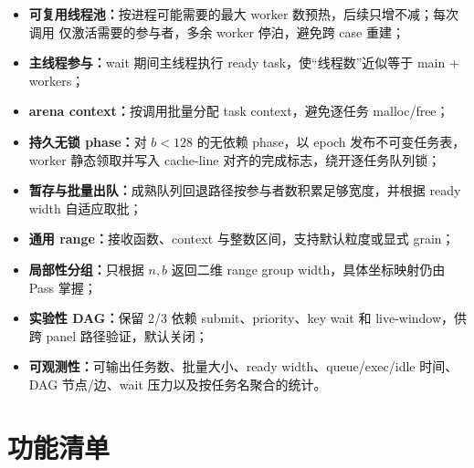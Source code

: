 \documentclass[UTF8,a4paper,openany,11pt,fontset=fandol]{ctexrep}
\begin{document}
\begin{itemize}
  \item \textbf{可复用线程池：}按进程可能需要的最大 worker 数预热，后续只增不减；每次调用
        仅激活需要的参与者，多余 worker 停泊，避免跨 case 重建；
  \item \textbf{主线程参与：}wait 期间主线程执行 ready task，使“线程数”近似等于
        main + workers；
  \item \textbf{arena context：}按调用批量分配 task context，避免逐任务 malloc/free；
  \item \textbf{持久无锁 phase：}对 \(b<128\) 的无依赖 phase，以 epoch 发布不可变任务表，
        worker 静态领取并写入 cache-line 对齐的完成标志，绕开逐任务队列锁；
  \item \textbf{暂存与批量出队：}成熟队列回退路径按参与者数积累足够宽度，并根据 ready width
        自适应取批；
  \item \textbf{通用 range：}接收函数、context 与整数区间，支持默认粒度或显式 grain；
  \item \textbf{局部性分组：}只根据 \(n,b\) 返回二维 range group width，具体坐标映射仍由 Pass 掌握；
  \item \textbf{实验性 DAG：}保留 2/3 依赖 submit、priority、key wait 和 live-window，供
        跨 panel 路径验证，默认关闭；
  \item \textbf{可观测性：}可输出任务数、批量大小、ready width、queue/exec/idle 时间、
        DAG 节点/边、wait 压力以及按任务名聚合的统计。
\end{itemize}

\section{功能清单}
\end{document}
